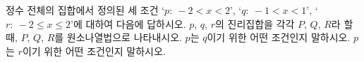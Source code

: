 정수 전체의 집합에서 정의된 세 조건 `$p:\ -2<x<2$', `$q:\ -1<x<1$', `$r:\ -2\le x\le 2$'에 대하여 다음에 답하시오.
 $p$, $q$, $r$의 진리집합을 각각 $P$, $Q$, $R$라 할 때, $P$, $Q$, $R$를 원소나열법으로 나타내시오.
 $p$는 $q$이기 위한 어떤 조건인지 말하시오.
 $p$는 $r$이기 위한 어떤 조건인지 말하시오.
